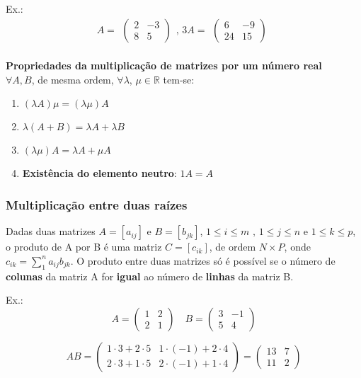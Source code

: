 \documentclass[12pt]{article}
\begin{document}
\noindent
Ex.: \[ A =
\begin{array}{c}
    \begin{pmatrix}
         2  & -3 \\
         8  &  5
    \end{pmatrix}
\end{array}
    \text{, }
3A = 
\begin{array}{c}
    \begin{pmatrix}
         6  &  -9 \\
        24  & 15
    \end{pmatrix}
\end{array}
\]
\\
\noindent
\textbf{Propriedades da multiplicação de matrizes por um número real}
\\
$\forall A,B$, de mesma ordem, $\forall \lambda$, $\mu \in \mathbb{R}$  tem-se:
\begin{enumerate}[label=\textbf{\alph*)}]
    \item \( (\lambda A) \mu = (\lambda \mu) A \)
    \item \( \lambda (A+B) = \lambda A + \lambda B \)
    \item \( (\lambda \mu) A = \lambda A + \mu A \)
    \item \textbf{Existência do elemento neutro}: \( 1A = A \)
\end{enumerate}

\subsubsection{Multiplicação entre duas raízes}
Dadas duas matrizes $A=[a_{ij}] \text{ e } B=[b_{jk}]$, $1 \leq i \leq m \text{ , } 1 \leq j \leq n \text{ e } 1 \leq k \leq p$,
o produto de A por B é uma matriz $C=[c_{ik}]$, de ordem $N \times P$, onde $c_{ik} = \sum_{1}^{n} a_{ij}b_{jk}$.
O produto entre duas matrizes só é possível se o número de \textbf{colunas} da matriz A for \textbf{igual} ao número de \textbf{linhas} da matriz B.

\noindent
Ex.: \[
A =
    \begin{pmatrix}
        1  &  2 \\
        2  &  1
    \end{pmatrix}
\quad
B =
    \begin{pmatrix}
        3  & -1 \\
        5  &  4
    \end{pmatrix}
\]

\[
AB =
    \begin{pmatrix}
        1 \cdot 3 + 2 \cdot 5 & 1 \cdot (-1) + 2 \cdot 4 \\
        2 \cdot 3 + 1 \cdot 5 & 2 \cdot (-1) + 1 \cdot 4
    \end{pmatrix}
=
    \begin{pmatrix}
        13  &  7 \\
        11  &  2
    \end{pmatrix}
\]
\end{document}

